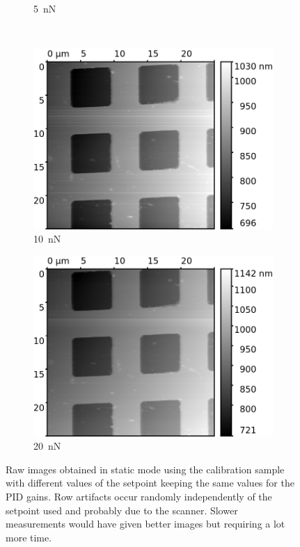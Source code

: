 \documentclass[11pt,a4paper]{article}
\begin{document}
\begin{appendices}
\begin{figure}[H]
\begin{subfigure}[b]{0.48\textwidth}
\caption{\SI{5}{\nano\N}}
\end{subfigure}\\\vspace{.2cm}
\begin{subfigure}[b]{0.48\textwidth}
\includegraphics[width=\textwidth]{static_mode_setpoint_10}
\caption{\SI{10}{\nano\N}}
\end{subfigure}
\begin{subfigure}[b]{0.48\textwidth}
\includegraphics[width=\textwidth]{static_mode_setpoint_20}
\caption{\SI{20}{\nano\N}}
\end{subfigure}
\caption{Raw images obtained in static mode using the calibration sample with different values of the setpoint keeping the same values for the PID gains. Row artifacts occur randomly independently of the setpoint used and probably due to the scanner. Slower measurements would have given better images but requiring a lot more time.}
\end{figure}


\end{appendices}
\end{document}
